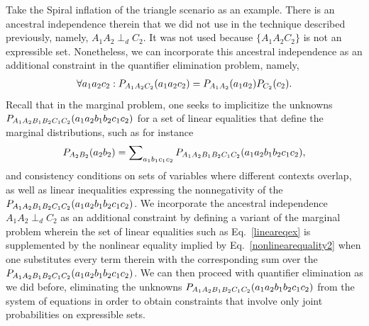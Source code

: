\documentclass[aps,english,10pt,superscriptaddress,onecolumn,twoside,longbibliography,pra,floatfix,fleqn,nofootinbib]{revtex4-1}%
\theoremstyle{definition}
\newcounter{example}[section]
\newcommand{\p}[2][]{{P_{#1}}\parenths{#2}}
\DeclarePairedDelimiter{\parenths}{\lparen}{\rparen}
\begin{document}
Take the Spiral inflation of the triangle scenario as an example.  There is an ancestral independence therein that we did not use in the technique described previously, namely, $A_1 A_2 \perp_d C_2$.  It was not used because $\{A_1 A_2 C_2\}$ is not an expressible set.  Nonetheless, we can incorporate this ancestral independence as an additional constraint in the quantifier elimination problem, namely,
\begin{align}\label{nonlinearequality2}
\forall{a_1 a_2 c_2}: \p[A_1 A_2 C_2]{a_1 a_2 c_2}=\p[A_1 A_2 ]{a_1 a_2 }\p[ C_2]{c_2}.
\end{align}
Recall that in the marginal problem, one seeks to implicitize the unknowns $\p[A_1 A_2 B_1 B_2 C_1 C_2]{a_1 a_2 b_1 b_2 c_1 c_2}$ for a set of linear equalities that define the marginal distributions, such as for instance
\begin{align}\label{lineareqex}
\p[A_2 B_2]{a_2 b_2} = \sum\nolimits_{a_1 b_1 c_1 c_2}\p[A_1 A_2 B_1 B_2 C_1 C_2]{a_1 a_2 b_1 b_2 c_1 c_2},
\end{align}
and consistency conditions on sets of variables where different contexts overlap, as well as linear inequalities expressing the nonnegativity of the $\p[A_1 A_2 B_1 B_2 C_1 C_2]{a_1 a_2 b_1 b_2 c_1 c_2}$.  
We incorporate the ancestral independence $A_1 A_2 \perp_d C_2$ as an additional constraint by defining a variant of the marginal problem wherein the set of linear equalities such as Eq.~\eqref{lineareqex} is supplemented by the nonlinear equality implied by Eq.~\eqref{nonlinearequality2} when one substitutes every term therein with the corresponding sum over the $\p[A_1 A_2 B_1 B_2 C_1 C_2]{a_1 a_2 b_1 b_2 c_1 c_2}$.  
We can then proceed with quantifier elimination as we did before, eliminating the unknowns $\p[A_1 A_2 B_1 B_2 C_1 C_2]{a_1 a_2 b_1 b_2 c_1 c_2}$ from the system of equations in order to obtain constraints that involve only joint probabilities on expressible sets.
\color{blue}
\end{document}
